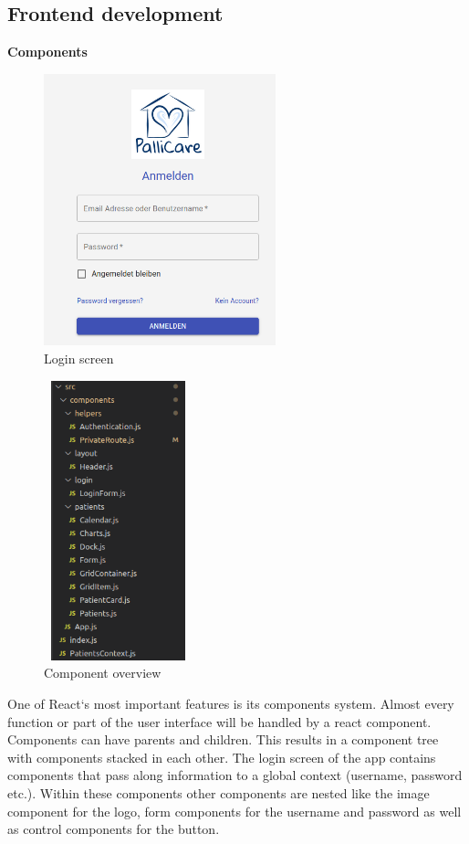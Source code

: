 \subsection{Frontend development}

\textbf{Components}

\begin{figure}[h]
 	\centering
 	\includegraphics[width=2.65in,height=3.1in]{./media/image4.png}
 	\caption{Login screen}
\end{figure}


\begin{figure}[h]
	\centering
	\includegraphics[width=1.7in,height=3.19in]{./media/image3.png}
	\caption{Component overview}
\end{figure}

One of React‘s most important features is its components system. Almost every function or part of the user interface will be handled by a react component. Components can have parents and children. This results in a component tree with components stacked in each other. The login screen of the app contains components that pass along information to a global context (username, password etc.). Within these components other components are nested like the image component for the logo, form components for the username and password as well as control components for the button.

